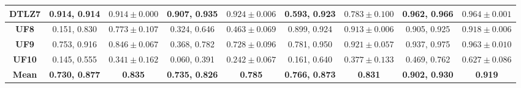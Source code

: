 \begin{table*}[t]
\begin{tabular}{c|c|c|c|c|c|c|c|c|}
\multicolumn{1}{|c|}{\textbf{DTLZ7}} & 0.914, 0.914            & $0.914 \pm 0.000$       & 0.907, 0.935            & $0.924 \pm 0.006$       & 0.593, 0.923            & $0.783 \pm 0.100$       & 0.962, 0.966            & $0.964 \pm 0.001$       \\ \hline
\multicolumn{1}{|c|}{\textbf{UF8}}   & 0.151, 0.830            & $0.773 \pm 0.107$       & 0.324, 0.646            & $0.463 \pm 0.069$       & 0.899, 0.924            & $0.913 \pm 0.006$       & 0.905, 0.925            & $0.918 \pm 0.006$       \\ \hline
\multicolumn{1}{|c|}{\textbf{UF9}}   & 0.753, 0.916            & $0.846 \pm 0.067$       & 0.368, 0.782            & $0.728 \pm 0.096$       & 0.781, 0.950            & $0.921 \pm 0.057$       & 0.937, 0.975            & $0.963 \pm 0.010$       \\ \hline
\multicolumn{1}{|c|}{\textbf{UF10}}  & 0.145, 0.555            & $0.341 \pm 0.162$       & 0.060, 0.391            & $0.242 \pm 0.067$       & 0.161, 0.640            & $0.377 \pm 0.133$       & 0.469, 0.762            & $0.627 \pm 0.086$       \\ \hline
\multicolumn{1}{|c|}{\textbf{Mean}}  & \textbf{0.730, 0.877}   & \textbf{0.835}          & \textbf{0.735, 0.826}   & \textbf{0.785}          & \textbf{0.766, 0.873}   & \textbf{0.831}          & \textbf{0.902, 0.930}   & \textbf{0.919}          \\ \hline
\end{tabular}%
\end{table*}

